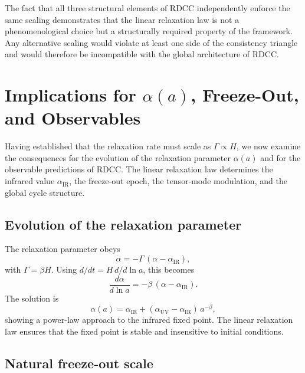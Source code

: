\documentclass[11pt,a4paper]{article}
\begin{document}
The fact that all three structural elements of RDCC independently enforce the same
scaling demonstrates that the linear relaxation law is not a phenomenological choice but
a structurally required property of the framework. Any alternative scaling would violate
at least one side of the consistency triangle and would therefore be incompatible with
the global architecture of RDCC.

\section{Implications for \texorpdfstring{$\alpha(a)$}{α(a)}, Freeze-Out, and Observables}

Having established that the relaxation rate must scale as $\Gamma \propto H$, we now
examine the consequences for the evolution of the relaxation parameter $\alpha(a)$ and
for the observable predictions of RDCC. The linear relaxation law determines the
infrared value $\alpha_{\mathrm{IR}}$, the freeze-out epoch, the tensor-mode modulation, and
the global cycle structure.

\subsection{Evolution of the relaxation parameter}

The relaxation parameter obeys
\begin{equation}
    \dot{\alpha} = -\Gamma\,(\alpha - \alpha_{\mathrm{IR}}),
\end{equation}
with $\Gamma = \beta H$. Using $d/dt = H\, d/d\ln a$, this becomes
\begin{equation}
    \frac{d\alpha}{d\ln a}
    = -\beta\,(\alpha - \alpha_{\mathrm{IR}}).
\end{equation}
The solution is
\begin{equation}
    \alpha(a)
    = \alpha_{\mathrm{IR}}
    + (\alpha_{\mathrm{UV}} - \alpha_{\mathrm{IR}})\, a^{-\beta},
\end{equation}
showing a power-law approach to the infrared fixed point. The linear relaxation law
ensures that the fixed point is stable and insensitive to initial conditions.

\subsection{Natural freeze-out scale}
\end{document}
